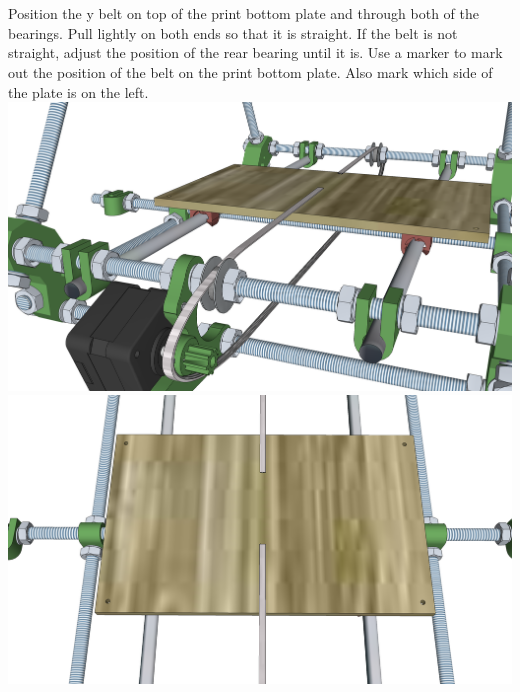 \documentclass[twoside,openany,a4paper,titlepage]{memoir}
\begin{document}
	\section{}
	Position the y belt on top of the print bottom plate and through both of the bearings. Pull lightly on both
	ends so that it is straight. If the belt is not straight, adjust the position of the rear bearing until it is. 		Use a marker to mark out the position of the belt on the print bottom plate. Also mark which side of the plate 		is on the left.\\
	\includegraphics[width=1\linewidth]{graphics/ch6_20_1.png}
	\includegraphics[width=1\linewidth]{graphics/ch6_20_2.png}
	
\end{document}
